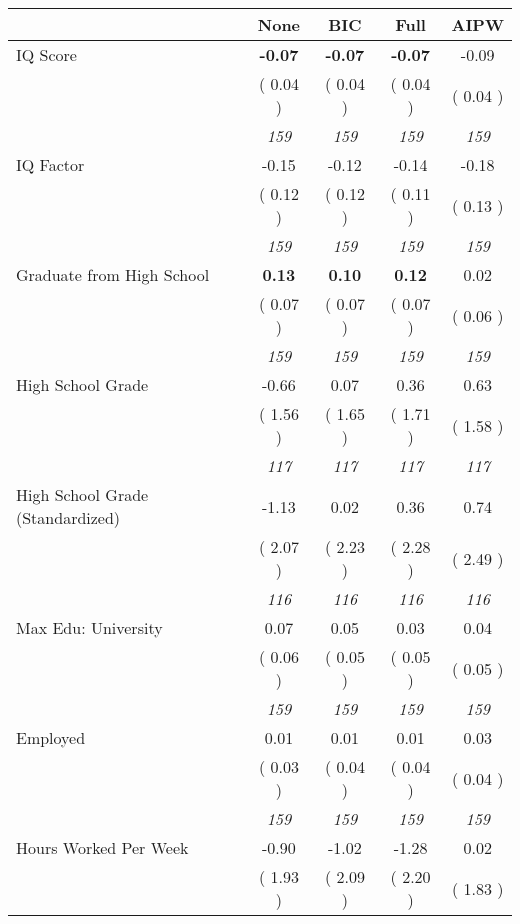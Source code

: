 \begin{tabular}{l c c c c}
\toprule
 & None & BIC & Full & AIPW \\
\midrule
IQ Score & \textbf{     -0.07 } & \textbf{     -0.07 } & \textbf{     -0.07 } &     -0.09 \\
& (     0.04 ) & (     0.04 ) & (     0.04 ) & (     0.04 ) \\
& \textit{ 159 } & \textit{ 159 } & \textit{ 159 } & \textit{ 159 } \\
IQ Factor &     -0.15 &     -0.12 &     -0.14 &     -0.18 \\
& (     0.12 ) & (     0.12 ) & (     0.11 ) & (     0.13 ) \\
& \textit{ 159 } & \textit{ 159 } & \textit{ 159 } & \textit{ 159 } \\
Graduate from High School & \textbf{      0.13 } & \textbf{      0.10 } & \textbf{      0.12 } &      0.02 \\
& (     0.07 ) & (     0.07 ) & (     0.07 ) & (     0.06 ) \\
& \textit{ 159 } & \textit{ 159 } & \textit{ 159 } & \textit{ 159 } \\
High School Grade &     -0.66 &      0.07 &      0.36 &      0.63 \\
& (     1.56 ) & (     1.65 ) & (     1.71 ) & (     1.58 ) \\
& \textit{ 117 } & \textit{ 117 } & \textit{ 117 } & \textit{ 117 } \\
High School Grade (Standardized) &     -1.13 &      0.02 &      0.36 &      0.74 \\
& (     2.07 ) & (     2.23 ) & (     2.28 ) & (     2.49 ) \\
& \textit{ 116 } & \textit{ 116 } & \textit{ 116 } & \textit{ 116 } \\
Max Edu: University &      0.07 &      0.05 &      0.03 &      0.04 \\
& (     0.06 ) & (     0.05 ) & (     0.05 ) & (     0.05 ) \\
& \textit{ 159 } & \textit{ 159 } & \textit{ 159 } & \textit{ 159 } \\
Employed &      0.01 &      0.01 &      0.01 &      0.03 \\
& (     0.03 ) & (     0.04 ) & (     0.04 ) & (     0.04 ) \\
& \textit{ 159 } & \textit{ 159 } & \textit{ 159 } & \textit{ 159 } \\
Hours Worked Per Week &     -0.90 &     -1.02 &     -1.28 &      0.02 \\
& (     1.93 ) & (     2.09 ) & (     2.20 ) & (     1.83 ) \\

\end{tabular}

